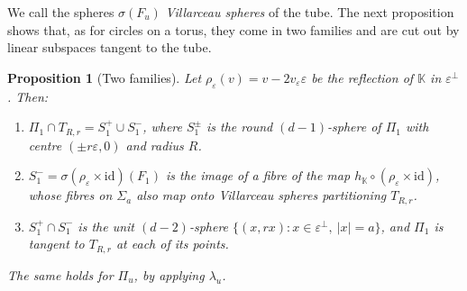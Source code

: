 \documentclass[11pt]{amsart}
\numberwithin{equation}{section}
\theoremstyle{plain}
\newtheorem{proposition}[theorem]{Proposition}
\theoremstyle{definition}
\theoremstyle{remark}
\newcommand{\K}{\mathbb{K}}
\begin{document}
We call the spheres $\sigma(F_u)$ \emph{Villarceau spheres} of the tube. The next proposition shows that, as for circles on a torus, they come in two families and are cut out by linear subspaces tangent to the tube.

\begin{proposition}[Two families]\label{prop:twofamilies}
Let $\rho_\varepsilon(v)=v-2v_\varepsilon\varepsilon$ be the reflection of $\K$ in $\varepsilon^\perp$. Then:
\begin{enumerate}[label=\textup{(\roman*)}]
\item $\Pi_1\cap T_{R,r}=S_1^+\cup S_1^-$, where $S_1^\pm$ is the round $(d-1)$-sphere of $\Pi_1$ with centre $(\pm r\varepsilon,0)$ and radius $R$.
\item $S_1^-=\sigma(\rho_\varepsilon\times\mathrm{id})(F_1)$ is the image of a fibre of the map $h_\K\circ(\rho_\varepsilon\times\mathrm{id})$, whose fibres on $\Sigma_a$ also map onto Villarceau spheres partitioning $T_{R,r}$.
\item $S_1^+\cap S_1^-$ is the unit $(d-2)$-sphere $\{(x,rx):x\in\varepsilon^\perp,\ |x|=a\}$, and $\Pi_1$ is tangent to $T_{R,r}$ at each of its points.
\end{enumerate}
The same holds for $\Pi_u$, by applying $\lambda_u$.
\end{proposition}
\end{document}
